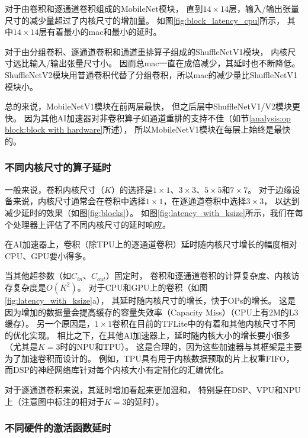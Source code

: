 对于由卷积和逐通道卷积组成的MobileNet模块，
直到$14\times 14$层，输入/输出张量尺寸的减少量超过了内核尺寸的增加量。
如图\ref{fig:block_latency_cpu}所示，
其中$14\times 14$层有着最小的mac和最小的延时。

对于由分组卷积、逐通道卷积和通道重排算子组成的ShuffleNetV1模块，
内核尺寸远比输入/输出张量尺寸小。
因而总mac一直在成倍减少，其延时也不断降低。
ShuffleNetV2模块用普通卷积代替了分组卷积，所以mac的减少量比ShuffleNetV1模块小。

总的来说，MobileNetV1模块在前两层最快，
但之后层中ShuffleNetV1/V2模块更快。
因为其他AI加速器对非卷积算子如通道重排的支持不佳（如节\ref{analysis:op block:block with hardware}所述），
所以MobileNetV1模块在每层上始终是最快的。

\subsubsection{不同内核尺寸的算子延时}
\label{analysis:op block:op with ksize}


一般来说，卷积内核尺寸（$K$）的选择是$1\times 1$、$3\times 3$、$5\times 5$和$7\times 7$。
对于边缘设备来说，内核尺寸通常会在卷积中选择$1\times 1$，在逐通道卷积中选择$3\times 3$，
以达到减少延时的效果（如图\ref{fig:blocks}）。
如图\ref{fig:latency_with_ksize}所示，我们在每个处理器上评估了不同内核尺寸的延时响应。

\begin{finding}
    在AI加速器上，卷积（除TPU上的逐通道卷积）延时随内核尺寸增长的幅度相对CPU、GPU要小得多。
\end{finding}

当其他超参数（如$C_{in}$、$C_{out}$）固定时，
卷积和逐通道卷积的计算复杂度、内核访存复杂度是$O(K^2)$。
对于CPU和GPU上的卷积（如图\ref{fig:latency_with_ksize}a），
其延时随内核尺寸的增长，快于OPs的增长。
这是因为增加的数据量会提高缓存的容量失效率（Capacity Miss）（CPU上有2M的L3缓存）。
另一个原因是，$1\times 1$卷积在目前的TFLite中的有着和其他内核尺寸不同的优化实现。
相比之下，在其他AI加速器上，延时随内核大小的增长要小很多（尤其是$K=3$时的NPU和TPU）。
这是合理的，因为这些加速器与其框架是主要为了加速卷积而设计的。
例如，TPU具有用于内核数据预取的片上权重FIFO，
而DSP的神经网络库针对每个内核大小有定制化的汇编优化。

对于逐通道卷积来说，其延时增加看起来更加温和，
特别是在DSP、VPU和NPU上（注意图中标注的相对于$K=3$的延时）。

\subsubsection{不同硬件的激活函数延时}
\label{analysis:op block:activation with hardware}


